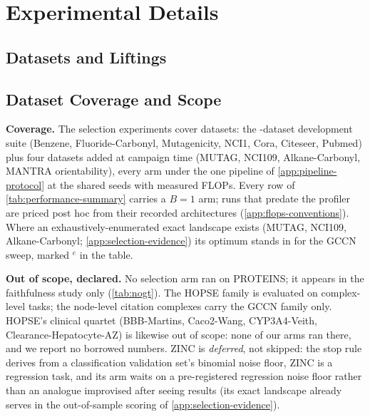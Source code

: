 \section{Experimental Details}
\label{app:experimental}

\subsection{Datasets and Liftings}

\subsection{Dataset Coverage and Scope}
\label{app:coverage}

\textbf{Coverage.} The selection experiments cover
\unfrozen{\ResLeadPanels} datasets: the
\unfrozen{\ResMarkerDatasets}-dataset development suite (Benzene,
Fluoride-Carbonyl, Mutagenicity, NCI1, Cora, Citeseer, Pubmed) plus
four datasets added at campaign time (MUTAG, NCI109, Alkane-Carbonyl,
MANTRA orientability), every arm under the one pipeline of
\cref{app:pipeline-protocol} at the shared seeds
\unfrozen{\ResSeedList} with measured FLOPs. Every row of
\cref{tab:performance-summary} carries a $B{=}1$ arm; runs that
predate the profiler are priced post hoc from their recorded
architectures (\cref{app:flops-conventions}). Where an
exhaustively-enumerated exact landscape exists (MUTAG, NCI109,
Alkane-Carbonyl; \cref{app:selection-evidence}) its optimum stands in
for the GCCN sweep, marked $^{e}$ in the table.

\textbf{Out of scope, declared.} No selection arm ran on PROTEINS;
it appears in the faithfulness study only (\cref{tab:nogt}). The
HOPSE family is evaluated on complex-level tasks; the node-level
citation complexes carry the GCCN family only. HOPSE's clinical quartet (BBB-Martins, Caco2-Wang,
CYP3A4-Veith, Clearance-Hepatocyte-AZ) is likewise out of scope: none
of our arms ran there, and we report no borrowed numbers. ZINC is
\emph{deferred}, not skipped: the stop rule derives from a
classification validation set's binomial noise floor, ZINC is a
regression task, and its arm waits on a pre-registered regression
noise floor rather than an analogue improvised after seeing results
(its exact landscape already serves in the out-of-sample scoring of
\cref{app:selection-evidence}).

